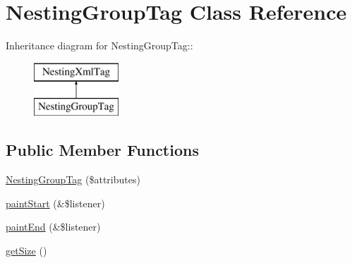 \hypertarget{class_nesting_group_tag}{
\section{NestingGroupTag Class Reference}
\label{class_nesting_group_tag}
}
Inheritance diagram for NestingGroupTag::\begin{figure}[H]
\begin{center}
\leavevmode
\includegraphics[height=2cm]{class_nesting_group_tag}
\end{center}
\end{figure}
\subsection*{Public Member Functions}
\begin{DoxyCompactItemize}
\item 
\hyperlink{class_nesting_group_tag_aa5a5531ce68090e860bb469eb65a246b}{NestingGroupTag} (\$attributes)
\item 
\hyperlink{class_nesting_group_tag_af2f93c4f4e8003733dee086baf9179c4}{paintStart} (\&\$listener)
\item 
\hyperlink{class_nesting_group_tag_a0800987bc9577f2460a502dc0becd692}{paintEnd} (\&\$listener)
\item 
\hyperlink{class_nesting_group_tag_a513da334c0a3d682b0c773f9e69ae74a}{getSize} ()
\end{DoxyCompactItemize}



